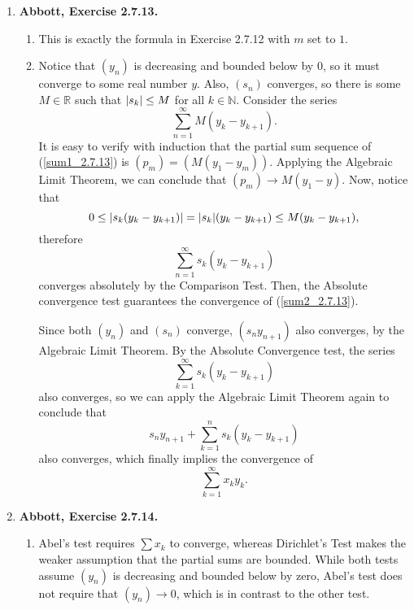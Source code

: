 \documentclass{article}
\DeclarePairedDelimiter\abs{\lvert}{\rvert}
\newcommand{\N}{\mathbb{N}}
\newcommand{\R}{\mathbb{R}}
\newcommand{\exc}[2][Abbott]{\item \textbf{#1, Exercise #2.}}
\begin{document}
\begin{enumerate}
    \exc{2.7.13}
    \begin{enumerate}
        \item This is exactly the formula in Exercise 2.7.12 with $m$ set to $1$.
        
        \item Notice that $(y_n)$ is decreasing and bounded below by $0$, so it must converge to some real number $y$. Also, $(s_n)$ converges, so there is some $M \in \R$ such that $\abs*{s_k} \leq M$ for all $k \in \N$. Consider the series
        \begin{equation}\label{sum1_2.7.13}
            \sum_{n=1}^\infty M (y_k - y_{k+1}).
        \end{equation} It is easy to verify with induction that the partial sum sequence of (\ref{sum1_2.7.13}) is $(p_m) = (M(y_1-y_m))$. Applying the Algebraic Limit Theorem, we can conclude that $(p_m) \to M(y_1-y)$. Now, notice that 
        \begin{equation*}
            0 \leq \abs*{s_k (y_k-y_{k+1})} = \abs*{s_k} (y_k-y_{k+1}) \leq 
            M (y_k-y_{k+1}),
        \end{equation*} therefore 
        \begin{equation} \label{sum2_2.7.13}
            \sum_{n=1}^\infty s_k (y_k-y_{k+1})
        \end{equation} converges absolutely by the Comparison Test. Then, the Absolute convergence test guarantees the convergence of (\ref{sum2_2.7.13}).
        
        Since both $(y_n)$ and $(s_n)$ converge, $(s_n y_{n+1})$ also converges, by the Algebraic Limit Theorem. By the Absolute Convergence test, the series 
        \begin{equation*}
            \sum_{k=1}^\infty s_k(y_k-y_{k+1})
        \end{equation*} also converges, so we can apply the Algebraic Limit Theorem again to conclude that 
        \begin{equation*}
           s_n y_{n+1} + \sum_{k=1}^n s_k(y_k-y_{k+1})
        \end{equation*} also converges, which finally implies the convergence of 
        \begin{equation*}
            \sum_{k=1}^\infty x_k y_k. 
        \end{equation*}
    \end{enumerate}
    
    \exc{2.7.14}
    \begin{enumerate}
        \item Abel's test requires $\sum x_k$ to converge, whereas Dirichlet's Test makes the weaker assumption that the partial sums are bounded. While both tests assume $(y_n)$ is decreasing and bounded below by zero, Abel's test does not require that $(y_n) \to 0$, which is in contrast to the other test.
        

\end{enumerate}
\end{enumerate}
\end{document}

